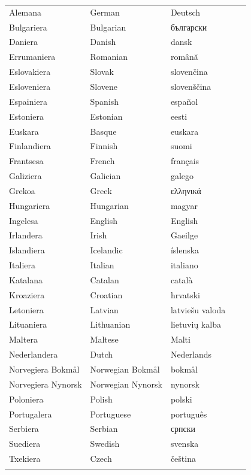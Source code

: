 \vspace*{-5mm}
\centering
  \setlength{\tabcolsep}{2em}
  \begin{tabularx}{\textwidth}{lllll} \toprule\addlinespace
  Alemana & German & Deutsch\\
  Bulgariera & Bulgarian & български \\
  Daniera & Danish & dansk\\
  Errumaniera & Romanian & română\\  
  Eslovakiera & Slovak & slovenčina\\
  Esloveniera & Slovene & slovenščina\\
  Espainiera & Spanish & español\\
  Estoniera & Estonian & eesti\\
  Euskara & Basque & euskara\\
  Finlandiera & Finnish & suomi\\
  Frantsesa & French & français\\
  Galiziera & Galician & galego\\
  Grekoa & Greek & ελληνικά\\
  Hungariera & Hungarian & magyar\\ 
  Ingelesa & English & English\\
  Irlandera & Irish & Gaeilge\\
  Islandiera & Icelandic & íslenska\\
  Italiera & Italian & italiano\\
  Katalana & Catalan & català\\
  Kroaziera & Croatian & hrvatski\\
  Letoniera & Latvian & latviešu valoda\\
  Lituaniera & Lithuanian & lietuvių kalba\\
  Maltera & Maltese & Malti\\
  Nederlandera & Dutch & Nederlands\\ 
  Norvegiera Bokmål & Norwegian Bokmål & bokmål\\
  Norvegiera Nynorsk & Norwegian Nynorsk & nynorsk\\
  Poloniera & Polish & polski\\
  Portugalera & Portuguese & português\\
  Serbiera & Serbian & српски\\
  Suediera & Swedish & svenska\\
  Txekiera & Czech & čeština\\  \addlinespace \bottomrule
\end{tabularx}
